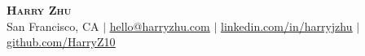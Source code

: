 \pagestyle{fancy}
\fancyhf{} %
\fancyfoot{}
\renewcommand{\headrulewidth}{0pt}
\renewcommand{\footrulewidth}{0pt}


\begin{center}
    \textbf{\Huge\scshape Harry Zhu} \\ \vspace{1pt}
    San Francisco, CA $|$ \href{mailto:hello@harryzhu.com}{\underline{hello@harryzhu.com}}
    $|$ \href{https://linkedin.com/in/harryjzhu}{\underline{linkedin.com/in/harryjzhu}}
    $|$ \href{https://github.com/HarryZ10}{\underline{github.com/HarryZ10}}
\end{center}

